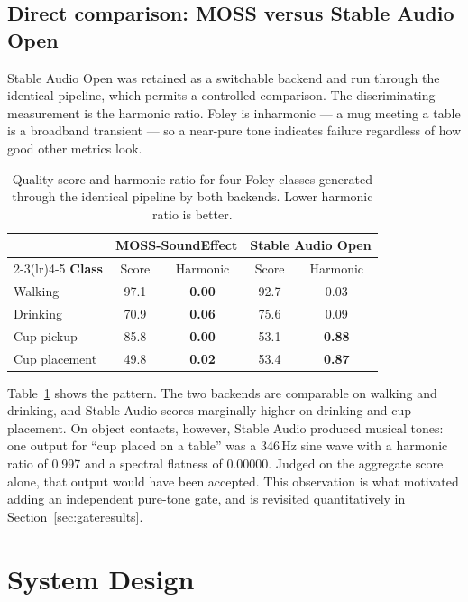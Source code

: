 \documentclass[conference]{IEEEtran}
\begin{document}
\subsection{Direct comparison: MOSS versus Stable Audio Open}

Stable Audio Open was retained as a switchable backend and run through the
identical pipeline, which permits a controlled comparison. The discriminating
measurement is the harmonic ratio. Foley is inharmonic --- a mug meeting a table
is a broadband transient --- so a near-pure tone indicates failure regardless of
how good other metrics look.

\begin{table}[t]
\caption{Quality score and harmonic ratio for four Foley classes generated
through the identical pipeline by both backends. Lower harmonic ratio is better.}
\label{tab:backends}
\centering
\small
\begin{tabular}{@{}lcccc@{}}
\toprule
& \multicolumn{2}{c}{\textbf{MOSS-SoundEffect}} & \multicolumn{2}{c}{\textbf{Stable Audio Open}} \\
\cmidrule(lr){2-3}\cmidrule(lr){4-5}
\textbf{Class} & Score & Harmonic & Score & Harmonic \\
\midrule
Walking       & 97.1 & \textbf{0.00} & 92.7 & 0.03 \\
Drinking      & 70.9 & \textbf{0.06} & 75.6 & 0.09 \\
Cup pickup    & 85.8 & \textbf{0.00} & 53.1 & \textbf{0.88} \\
Cup placement & 49.8 & \textbf{0.02} & 53.4 & \textbf{0.87} \\
\bottomrule
\end{tabular}
\end{table}

Table~\ref{tab:backends} shows the pattern. The two backends are comparable on
walking and drinking, and Stable Audio scores marginally higher on drinking and
cup placement. On object contacts, however, Stable Audio produced musical tones:
one output for ``cup placed on a table'' was a 346\,Hz sine wave with a harmonic
ratio of 0.997 and a spectral flatness of $0.00000$. Judged on the aggregate
score alone, that output would have been accepted. This observation is what
motivated adding an independent pure-tone gate, and is revisited quantitatively in
Section~\ref{sec:gateresults}.

\section{System Design}
\end{document}
